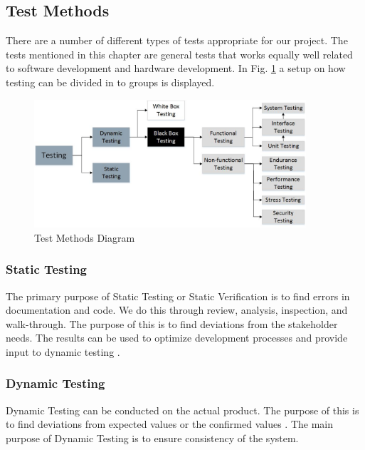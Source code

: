 \subsection{Test Methods}
There are a number of different types of tests appropriate for our project. The tests mentioned in this chapter are general tests that works equally well related to software development and hardware development. In Fig. \ref{fig:testing} a setup on how testing can be divided in to groups is displayed.

\begin{figure}[h]
    \centering
        \includegraphics[width=0.9\textwidth]{VAPIQ-PICTURES/testing}
        \caption{Test Methods Diagram}
        \label{fig:testing}
\end{figure}

\subsubsection*{Static Testing}
The primary purpose of Static Testing or Static Verification is to find errors in documentation and code. We do this through review, analysis, inspection, and walk-through. The purpose of this is to find deviations from the stakeholder needs. The results can be used to optimize development processes and provide input to dynamic testing \cite{ref3}. 

\subsubsection*{Dynamic Testing}
Dynamic Testing can be conducted on the actual product. The purpose of this is to find deviations from expected values or the confirmed values \cite{ref3}. The main purpose of Dynamic Testing is to ensure consistency of the system.
\newpage

 